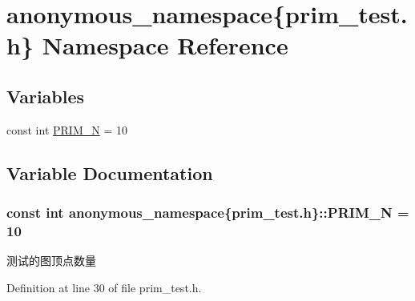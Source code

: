 \hypertarget{namespaceanonymous__namespace_02prim__test_8h_03}{}\section{anonymous\+\_\+namespace\{prim\+\_\+test.\+h\} Namespace Reference}
\label{namespaceanonymous__namespace_02prim__test_8h_03}
\subsection*{Variables}
\begin{DoxyCompactItemize}
\item 
const int \hyperlink{namespaceanonymous__namespace_02prim__test_8h_03_acd86cf553b1e2d6a5422054e595a4ea5}{P\+R\+I\+M\+\_\+\+N} = 10
\end{DoxyCompactItemize}


\subsection{Variable Documentation}
\hypertarget{namespaceanonymous__namespace_02prim__test_8h_03_acd86cf553b1e2d6a5422054e595a4ea5}{}
\subsubsection[{P\+R\+I\+M\+\_\+\+N}]{\setlength{\rightskip}{0pt plus 5cm}const int anonymous\+\_\+namespace\{prim\+\_\+test.\+h\}\+::P\+R\+I\+M\+\_\+\+N = 10}\label{namespaceanonymous__namespace_02prim__test_8h_03_acd86cf553b1e2d6a5422054e595a4ea5}
测试的图顶点数量 

Definition at line 30 of file prim\+\_\+test.\+h.

